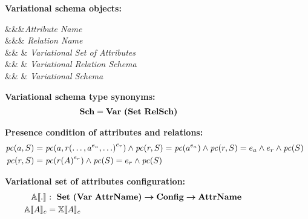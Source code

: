 \begin{figure}

\textbf{Variational schema objects:}
\begin{syntax}
\synDef \vAtt \attnametype &&&\textit{Attribute Name}\\
\synDef \vRel \relnametype &&& \textit{Relation Name}\\
\synDef \vAttList \vAttSet &\eqq& 
 & \textit{Variational Set of Attributes}\\
\synDef \vRelSch \vRelSchSet &\eqq& \vRelDef & \textit{Variational Relation Schema}\\
\synDef \vSch \vSchSet &\eqq& \vSchDef & \textit{Variational Schema}
\end{syntax}

\medskip
\textbf{Variational schema type synonyms:}
\begin{alignat*}{1}
\vSchSet &= \vartype {\bm{(} \settype \relschtype\bm{)}}
\end{alignat*}

\medskip
\textbf{Presence condition of attributes and relations:}
\begin{alignat*}{1}
\getPCfrom {\vAtt} {\vSch} &= \getPCfrom {\vAtt} {\vRel \annot [\dimMeta_\vRel] {(\ldots, \annot [\dimMeta_\vAtt] \vAtt, \ldots)}} \wedge \getPCfrom \vRel \vSch = \getPC {\annot [\dimMeta_\vAtt] \vAtt} \wedge \getPCfrom \vRel \vSch=
\dimMeta_\vAtt \wedge \dimMeta_\vRel \wedge \getPC \vSch\\
\getPCfrom {\vRel} \vSch &= \getPC {\vRel \annot [\dimMeta_\vRel] {(\vAttList)}} \wedge \getPC {\vSch} = \dimMeta_\vRel \wedge \getPC \vSch
\end{alignat*}

\medskip
\textbf{Variational set of attributes configuration:}
\begin{alignat*}{1}
 \olSem [] . &: \ \vAttSet \totype \confSet \totype \pAttSet\\
 \olSem \vAttList &= \elemSem \vAttList
 \end{alignat*}


\end{figure}
